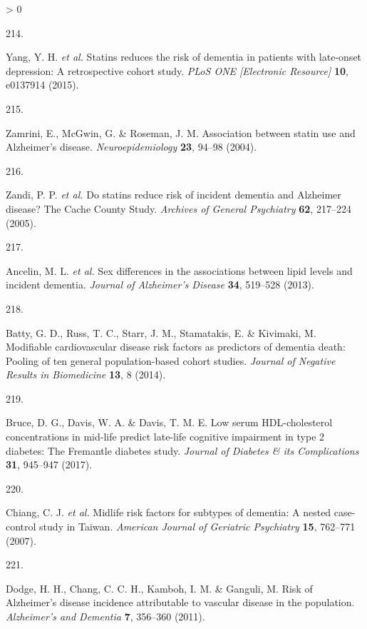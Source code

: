 \documentclass[a4paper, twoside]{templates/ociamthesis}
\newlength{\cslhangindent}
\newlength{\csllabelwidth}
\newenvironment{CSLReferences}[3] %
 {%
  \setlength{\parindent}{0pt}
  \ifodd #1 \everypar{\setlength{\hangindent}{\cslhangindent}}\ignorespaces\fi
  \ifnum #2 > 0
  \setlength{\parskip}{#2\baselineskip}
  \fi
 }%
 {}
\newcommand{\CSLLeftMargin}[1]{\parbox[t]{\maxof{\widthof{#1}}{\csllabelwidth}}{#1}}
\newcommand{\CSLRightInline}[1]{\parbox[t]{\linewidth - \csllabelwidth}{#1}}
\begin{document}
\begin{CSLReferences}{0}{0}
\leavevmode\hypertarget{ref-yang2015}{}%
\CSLLeftMargin{214. }
\CSLRightInline{Yang, Y. H. \emph{et al.} Statins reduces the risk of dementia in patients with late-onset depression: A retrospective cohort study. \emph{PLoS ONE {[}Electronic Resource{]}} \textbf{10}, e0137914 (2015).}

\leavevmode\hypertarget{ref-zamrini2004}{}%
\CSLLeftMargin{215. }
\CSLRightInline{Zamrini, E., McGwin, G. \& Roseman, J. M. Association between statin use and {Alzheimer}'s disease. \emph{Neuroepidemiology} \textbf{23}, 94--98 (2004).}

\leavevmode\hypertarget{ref-zandi2005}{}%
\CSLLeftMargin{216. }
\CSLRightInline{Zandi, P. P. \emph{et al.} Do statins reduce risk of incident dementia and {Alzheimer} disease? The {Cache County Study}. \emph{Archives of General Psychiatry} \textbf{62}, 217--224 (2005).}

\leavevmode\hypertarget{ref-ancelin2013}{}%
\CSLLeftMargin{217. }
\CSLRightInline{Ancelin, M. L. \emph{et al.} Sex differences in the associations between lipid levels and incident dementia. \emph{Journal of Alzheimer's Disease} \textbf{34}, 519--528 (2013).}

\leavevmode\hypertarget{ref-batty2014}{}%
\CSLLeftMargin{218. }
\CSLRightInline{Batty, G. D., Russ, T. C., Starr, J. M., Stamatakis, E. \& Kivimaki, M. Modifiable cardiovascular disease risk factors as predictors of dementia death: Pooling of ten general population-based cohort studies. \emph{Journal of Negative Results in Biomedicine} \textbf{13}, 8 (2014).}

\leavevmode\hypertarget{ref-bruce2017}{}%
\CSLLeftMargin{219. }
\CSLRightInline{Bruce, D. G., Davis, W. A. \& Davis, T. M. E. Low serum {HDL}-cholesterol concentrations in mid-life predict late-life cognitive impairment in type 2 diabetes: The {Fremantle} diabetes study. \emph{Journal of Diabetes \& its Complications} \textbf{31}, 945--947 (2017).}

\leavevmode\hypertarget{ref-chiang2007}{}%
\CSLLeftMargin{220. }
\CSLRightInline{Chiang, C. J. \emph{et al.} Midlife risk factors for subtypes of dementia: A nested case-control study in {Taiwan}. \emph{American Journal of Geriatric Psychiatry} \textbf{15}, 762--771 (2007).}

\leavevmode\hypertarget{ref-dodge2011}{}%
\CSLLeftMargin{221. }
\CSLRightInline{Dodge, H. H., Chang, C. C. H., Kamboh, I. M. \& Ganguli, M. Risk of {Alzheimer}'s disease incidence attributable to vascular disease in the population. \emph{Alzheimer's and Dementia} \textbf{7}, 356--360 (2011).}


\end{CSLReferences}
\end{document}
